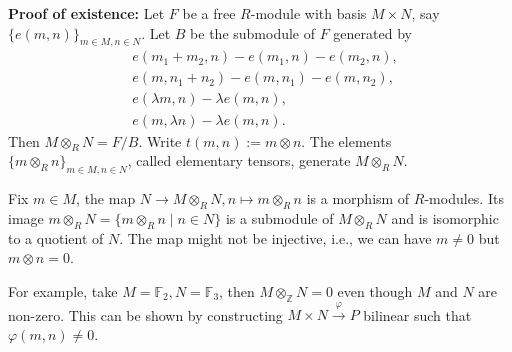 \documentclass[11pt, a4paper]{report}
\begin{document}
\textbf{Proof of existence:} Let $F$ be a free $R$-module with basis $M \times N$, say $\{e(m,n)\}_{m \in M, n \in N}$. Let $B$ be the submodule of $F$ generated by
\[
\begin{aligned}
& e\left(m_{1}+m_{2}, n\right)-e\left(m_{1}, n\right)-e\left(m_{2}, n\right), \\
& e\left(m, n_{1}+n_{2}\right)-e\left(m, n_{1}\right)-e\left(m, n_{2}\right), \\
& e(\lambda m, n)-\lambda e(m, n), \\
& e(m, \lambda n)-\lambda e(m, n).
\end{aligned}
\]
Then $M \otimes_{R} N=F / B$. Write $t(m, n):=m \otimes n$. The elements $\{m \otimes_{R} n\}_{m \in M, n \in N}$, called elementary tensors, generate $M \otimes_{R} N$.

Fix $m \in M$, the map $N \rightarrow M \otimes_{R} N, n \mapsto m \otimes_{R} n$ is a morphism of $R$-modules. Its image $m \otimes_{R} N=\{m \otimes_{R} n \mid n \in N\}$ is a submodule of $M \otimes_{R} N$ and is isomorphic to a quotient of $N$. The map might not be injective, i.e., we can have $m \neq 0$ but $m \otimes n = 0$.

For example, take $M=\mathbb{F}_{2}, N=\mathbb{F}_{3}$, then $M \otimes_{\mathbb{Z}} N=0$ even though $M$ and $N$ are non-zero. This can be shown by constructing $M \times N \xrightarrow{\varphi} P$ bilinear such that $\varphi(m, n) \neq 0$.
\end{document}
